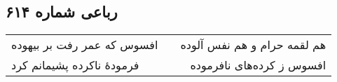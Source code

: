 \begin{center}
\section*{رباعی شماره ۶۱۴}
\label{sec:sh614}
\begin{longtable}{l p{0.5cm} r}
افسوس که عمر رفت بر بیهوده
&&
هم لقمه حرام و هم نفس آلوده
\\
فرمودهٔ ناکرده پشیمانم کرد
&&
افسوس ز کرده‌های نافرموده
\\
\end{longtable}
\end{center}
